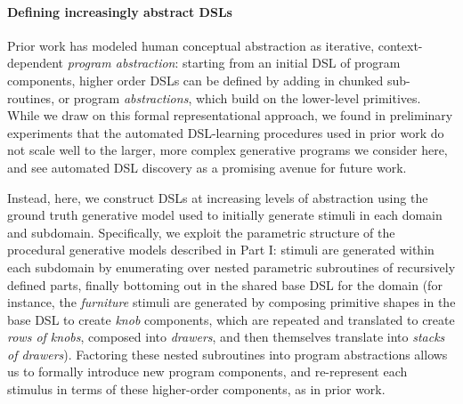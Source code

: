 \documentclass[10pt,letterpaper]{article}
\begin{document}
\paragraph{Defining increasingly abstract DSLs} Prior work  has modeled human conceptual abstraction as iterative, context-dependent \textit{program abstraction}: starting from an initial DSL of program components, higher order DSLs can be defined by adding in chunked sub-routines, or program \textit{abstractions}, which build on the lower-level primitives. While we draw on this formal representational approach, we found in preliminary experiments that the automated DSL-learning procedures used in prior work do not scale well to the larger, more complex generative programs we consider here, and see automated DSL discovery as a promising avenue for future work.

Instead, here, we construct DSLs at increasing levels of abstraction using the ground truth generative model used to initially generate stimuli in each domain and subdomain. Specifically, we exploit the parametric structure of the procedural generative models described in Part I: stimuli are generated within each subdomain by enumerating over nested parametric subroutines of recursively defined parts, finally bottoming out in the shared base DSL for the domain (for instance, the \textit{furniture} stimuli are generated by composing primitive shapes in the base DSL to create \textit{knob} components, which are repeated and translated to create \textit{rows of knobs}, composed into \textit{drawers}, and then themselves translate into \textit{stacks of drawers}). Factoring these nested subroutines into program abstractions allows us to formally introduce new program components, and re-represent each stimulus in terms of these higher-order components, as in prior work.
\end{document}
